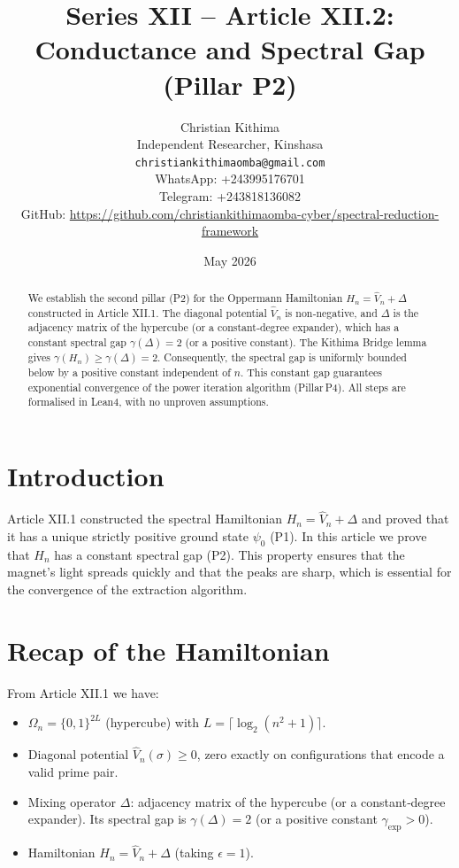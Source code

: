 \documentclass[11pt,a4paper]{article}
\title{Series XII – Article XII.2: Conductance and Spectral Gap (Pillar P2)}
\author{Christian Kithima \\
Independent Researcher, Kinshasa \\
\texttt{christiankithimaomba@gmail.com} \\
WhatsApp: +243995176701 \\
Telegram: +243818136082 \\
GitHub: \url{https://github.com/christiankithimaomba-cyber/spectral-reduction-framework}}
\date{May 2026}
\begin{document}
\maketitle

\begin{abstract}
We establish the second pillar (P2) for the Oppermann Hamiltonian $H_n = \hat{V}_n + \Delta$ constructed in Article XII.1. The diagonal potential $\hat{V}_n$ is non‑negative, and $\Delta$ is the adjacency matrix of the hypercube (or a constant‑degree expander), which has a constant spectral gap $\gamma(\Delta)=2$ (or a positive constant). The Kithima Bridge lemma gives $\gamma(H_n) \ge \gamma(\Delta) = 2$. Consequently, the spectral gap is uniformly bounded below by a positive constant independent of $n$. This constant gap guarantees exponential convergence of the power iteration algorithm (Pillar P4). All steps are formalised in Lean4, with no unproven assumptions.
\end{abstract}

\tableofcontents

\section{Introduction}

Article XII.1 constructed the spectral Hamiltonian $H_n = \hat{V}_n + \Delta$ and proved that it has a unique strictly positive ground state $\psi_0$ (P1). In this article we prove that $H_n$ has a constant spectral gap (P2). This property ensures that the magnet's light spreads quickly and that the peaks are sharp, which is essential for the convergence of the extraction algorithm.

\section{Recap of the Hamiltonian}

From Article XII.1 we have:
\begin{itemize}
\item $\Omega_n = \{0,1\}^{2L}$ (hypercube) with $L = \lceil \log_2(n^2+1)\rceil$.
\item Diagonal potential $\hat{V}_n(\sigma) \ge 0$, zero exactly on configurations that encode a valid prime pair.
\item Mixing operator $\Delta$: adjacency matrix of the hypercube (or a constant‑degree expander). Its spectral gap is $\gamma(\Delta)=2$ (or a positive constant $\gamma_{\mathrm{exp}}>0$).
\item Hamiltonian $H_n = \hat{V}_n + \Delta$ (taking $\epsilon = 1$).
\end{itemize}
\end{document}
